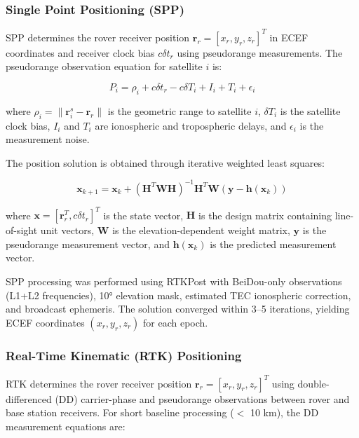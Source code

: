 \documentclass{isprs} %
\begin{document}
\subsubsection{Single Point Positioning (SPP)\\}
SPP determines the rover receiver position \(\mathbf{r}_r = [x_r, y_r, z_r]^T\) in ECEF coordinates and receiver clock bias \(c\delta t_r\) using pseudorange measurements. The pseudorange observation equation for satellite \(i\) is:

\begin{equation}
P_i = \rho_i + c\delta t_r - c\delta T_i + I_i + T_i + \epsilon_i
\end{equation}

where \(\rho_i = \|\mathbf{r}^s_i - \mathbf{r}_r\|\) is the geometric range to satellite \(i\), \(\delta T_i\) is the satellite clock bias, \(I_i\) and \(T_i\) are ionospheric and tropospheric delays, and \(\epsilon_i\) is the measurement noise.

The position solution is obtained through iterative weighted least squares:

\begin{equation}
\mathbf{x}_{k+1} = \mathbf{x}_k + (\mathbf{H}^T\mathbf{W}\mathbf{H})^{-1}\mathbf{H}^T\mathbf{W}(\mathbf{y} - \mathbf{h}(\mathbf{x}_k))
\end{equation}

where \(\mathbf{x} = [\mathbf{r}_r^T, c\delta t_r]^T\) is the state vector, \(\mathbf{H}\) is the design matrix containing line-of-sight unit vectors, \(\mathbf{W}\) is the elevation-dependent weight matrix, \(\mathbf{y}\) is the pseudorange measurement vector, and \(\mathbf{h}(\mathbf{x}_k)\) is the predicted measurement vector.

SPP processing was performed using RTKPost with BeiDou-only observations (L1+L2 frequencies), 10° elevation mask, estimated TEC ionospheric correction, and broadcast ephemeris. The solution converged within 3–5 iterations, yielding ECEF coordinates \((x_r, y_r, z_r)\) for each epoch.



\subsubsection{Real-Time Kinematic (RTK) Positioning}

RTK determines the rover receiver position \(\mathbf{r}_r = [x_r, y_r, z_r]^T\) using double-differenced (DD) carrier-phase and pseudorange observations between rover and base station receivers. For short baseline processing ($<$ 10 km), the DD measurement equations are:
\end{document}
